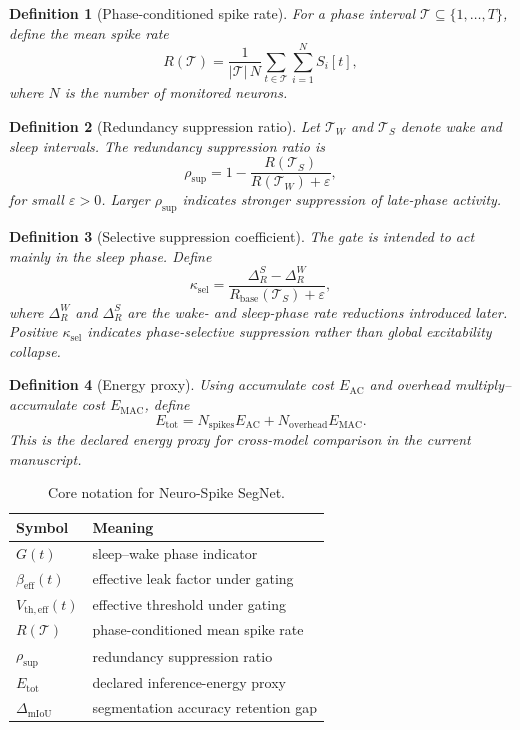 \documentclass[11pt]{article}
\newtheorem{definition}{Definition}
\begin{document}
\begin{definition}[Phase-conditioned spike rate]
For a phase interval $\mathcal{T}\subseteq\{1,\dots,T\}$, define the mean spike rate
\[
R(\mathcal{T})=\frac{1}{|\mathcal{T}|\,N}\sum_{t\in\mathcal{T}}\sum_{i=1}^{N}S_i[t],
\]
where $N$ is the number of monitored neurons.
\end{definition}

\begin{definition}[Redundancy suppression ratio]
Let $\mathcal{T}_W$ and $\mathcal{T}_S$ denote wake and sleep intervals. The redundancy suppression ratio is
\[
\rho_{\mathrm{sup}}=1-\frac{R(\mathcal{T}_S)}{R(\mathcal{T}_W)+\varepsilon},
\]
for small $\varepsilon>0$. Larger $\rho_{\mathrm{sup}}$ indicates stronger suppression of late-phase activity.
\end{definition}

\begin{definition}[Selective suppression coefficient]
The gate is intended to act mainly in the sleep phase. Define
\[
\kappa_{\mathrm{sel}}=
\frac{\Delta_R^{S}-\Delta_R^{W}}{R_{\mathrm{base}}(\mathcal{T}_S)+\varepsilon},
\]
where $\Delta_R^{W}$ and $\Delta_R^{S}$ are the wake- and sleep-phase rate reductions introduced later. Positive $\kappa_{\mathrm{sel}}$ indicates phase-selective suppression rather than global excitability collapse.
\end{definition}

\begin{definition}[Energy proxy]
Using accumulate cost $E_{\mathrm{AC}}$ and overhead multiply--accumulate cost $E_{\mathrm{MAC}}$, define
\[
E_{\mathrm{tot}}=N_{\mathrm{spikes}}E_{\mathrm{AC}}+N_{\mathrm{overhead}}E_{\mathrm{MAC}}.
\]
This is the declared energy proxy for cross-model comparison in the current manuscript.
\end{definition}

\begin{table}[t]
\centering
\small
\caption{Core notation for Neuro-Spike SegNet.}
\label{tab:nsn-notation}
\begin{tabular}{ll}
\toprule
Symbol & Meaning \\
\midrule
$G(t)$ & sleep--wake phase indicator \\
$\beta_{\mathrm{eff}}(t)$ & effective leak factor under gating \\
$V_{\mathrm{th,eff}}(t)$ & effective threshold under gating \\
$R(\mathcal{T})$ & phase-conditioned mean spike rate \\
$\rho_{\mathrm{sup}}$ & redundancy suppression ratio \\
$E_{\mathrm{tot}}$ & declared inference-energy proxy \\
$\Delta_{\mathrm{mIoU}}$ & segmentation accuracy retention gap \\
\bottomrule
\end{tabular}
\end{table}
\end{document}
